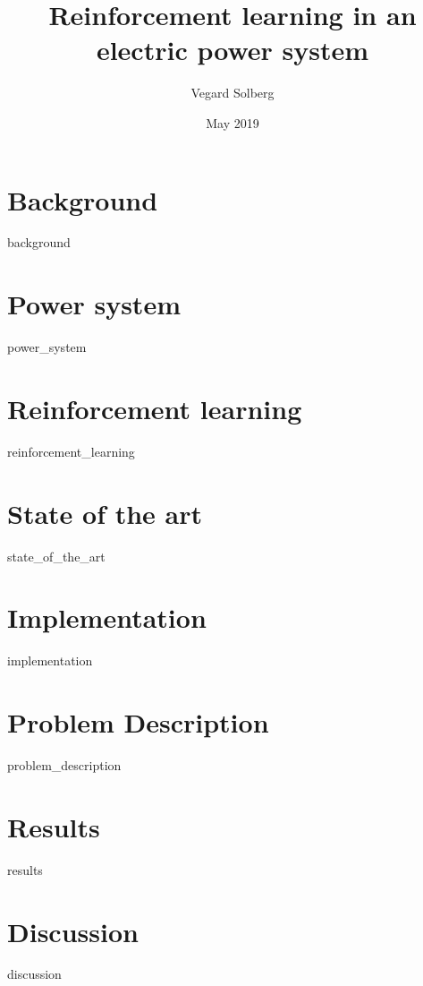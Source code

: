 \documentclass{book}
\title{Reinforcement learning in an electric power system}
\author{Vegard Solberg}
\date{May 2019}
\begin{document}
 
    \maketitle
    \tableofcontents
    
    \chapter{Background}
    {background}
    
    \chapter{Power system}
    {power_system}
 
    \chapter{Reinforcement learning}
    {reinforcement_learning}
    
    \chapter{State of the art}
    {state_of_the_art}
    
    \chapter{Implementation}
    {implementation}
    
    \chapter{Problem Description}
    {problem_description}
    
    \chapter{Results}
    {results}
    
    \chapter{Discussion}
    {discussion}
    
    \printbibliography
\end{document}
